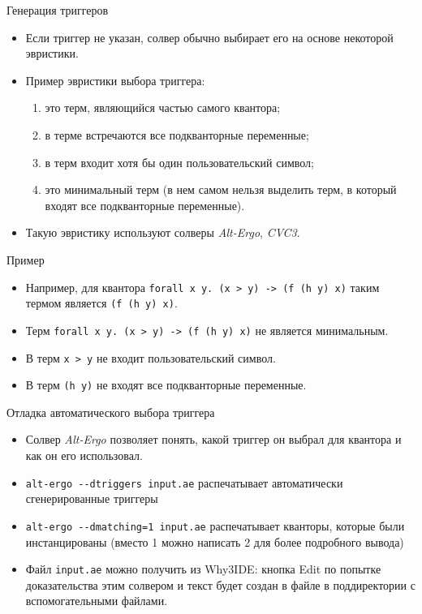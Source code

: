 \documentclass[hyperref={unicode=true}]{beamer}
\begin{document}
    \begin{frame}{Генерация триггеров}
    \begin{itemize}
    \item
    Если триггер не указан, солвер обычно выбирает его на основе
    некоторой эвристики.
    \item
    Пример эвристики выбора триггера:
        \begin{enumerate}
        \item это терм, являющийся частью самого квантора;
        \item в терме встречаются все подкванторные переменные;
        \item в терм входит хотя бы один пользовательский символ;
        \item это минимальный терм (в нем самом нельзя выделить
                терм, в который входят все подкванторные переменные).
        \end{enumerate}
    \item
    Такую эвристику используют солверы \textsl{Alt-Ergo}, \textsl{CVC3}.
    \end{itemize}
    \end{frame}

    \begin{frame}{Пример}
    \begin{itemize}
    \item Например, для квантора \texttt{forall x y. (x > y) -> (f (h y) x)}
    таким термом является \texttt{(f (h y) x)}.
    \item Терм \texttt{forall x y. (x > y) -> (f (h y) x)} не является
    минимальным.
    \item В терм \texttt{x > y} не входит пользовательский символ.
    \item В терм \texttt{(h y)} не входят все подкванторные переменные.
    \end{itemize}
    \end{frame}

    \begin{frame}{Отладка автоматического выбора триггера}
    \begin{itemize}
    \item
    Солвер \textsl{Alt-Ergo} позволяет понять, какой триггер он выбрал
    для квантора и как он его использовал.
    \item
    \texttt{alt-ergo -{}-dtriggers input.ae} распечатывает
    автоматически сгенерированные триггеры
    \item
    \texttt{alt-ergo -{}-dmatching=1 input.ae} распечатывает
    кванторы, которые были инстанцированы (вместо 1 можно написать 2 для
            более подробного вывода)
    \item
    Файл \texttt{input.ae} можно получить из Why3IDE: кнопка Edit
    по попытке доказательства этим солвером и текст будет создан в файле
    в поддиректории с вспомогательными файлами.
    \end{itemize}
    \end{frame}
\end{document}
